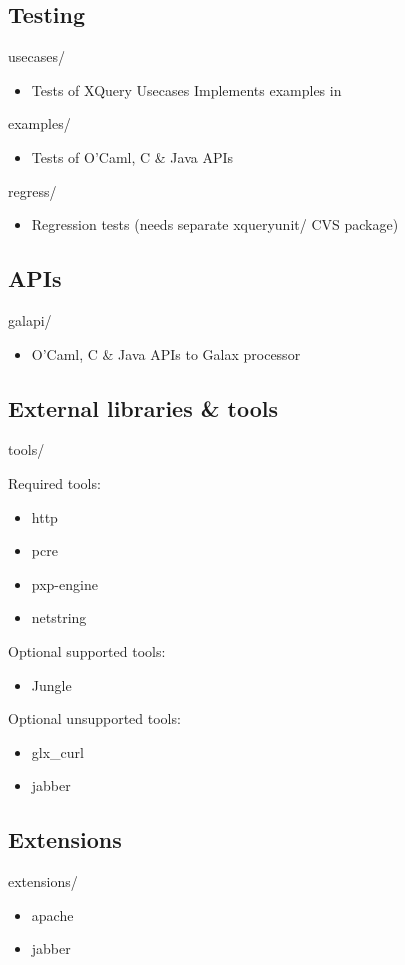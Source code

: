 \subsection{Testing}

usecases/
\begin{itemize}
\item   Tests of XQuery Usecases
    Implements examples in 
\end{itemize}
examples/
\begin{itemize}
\item   Tests of O'Caml, C \& Java APIs
\end{itemize}
regress/
\begin{itemize}
\item   Regression tests (needs separate xqueryunit/ CVS package)
\end{itemize}

\subsection{APIs}

galapi/   
\begin{itemize}
\item   O'Caml, C \& Java APIs to Galax processor
\end{itemize}

\subsection{External libraries \& tools}
tools/   

Required tools:
\begin{itemize}
\item   http
\item   pcre
\item   pxp-engine 
\item   netstring 
\end{itemize}

Optional supported tools:
\begin{itemize}
\item   Jungle
\end{itemize}

Optional unsupported tools:
\begin{itemize}
\item   glx\_curl
\item   jabber
\end{itemize}

\subsection{Extensions}
extensions/
\begin{itemize}
\item   apache
\item   jabber
\end{itemize}

